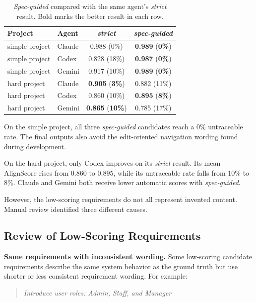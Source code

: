 \begin{table}[htbp]
  \centering
  \caption{\emph{Spec-guided} compared with the same agent's \emph{strict} result. Bold marks the better result in each row.}
  \label{tab:rq2-vs-strict}
  \begin{tabular}{@{}llcc@{}}
    \toprule
    Project & Agent & \emph{strict} & \emph{spec-guided} \\
    \midrule
    simple project & Claude & 0.988 (0\%)  & \textbf{0.989} (\textbf{0\%})  \\
    simple project & Codex  & 0.828 (18\%) & \textbf{0.987} (\textbf{0\%}) \\
    simple project & Gemini & 0.917 (10\%) & \textbf{0.989} (\textbf{0\%})  \\
    hard project   & Claude & \textbf{0.905} (\textbf{3\%})  & 0.882 (11\%)  \\
    hard project   & Codex  & 0.860 (10\%) & \textbf{0.895} (\textbf{8\%})  \\
    hard project   & Gemini & \textbf{0.865} (\textbf{10\%}) & 0.785 (17\%) \\
    \bottomrule
  \end{tabular}
\end{table}

On the simple project, all three \emph{spec-guided} candidates reach a
$0\%$ untraceable rate. The final outputs also avoid the edit-oriented
navigation wording found during development.

On the hard project, only Codex improves on its \emph{strict} result. Its mean
AlignScore rises from $0.860$ to $0.895$, while its untraceable rate falls
from $10\%$ to $8\%$. Claude and Gemini both receive lower automatic
scores with \emph{spec-guided}.

However, the low-scoring requirements do not all represent invented content.
Manual review identified three different causes.

\subsection{Review of Low-Scoring Requirements}

\textbf{Same requirements with inconsistent wording.}
Some low-scoring candidate requirements describe the same system behavior as
the ground truth but use shorter or less consistent requirement wording. For
example:

\begin{quote}
\emph{Introduce user roles: Admin, Staff, and Manager}
\end{quote}

